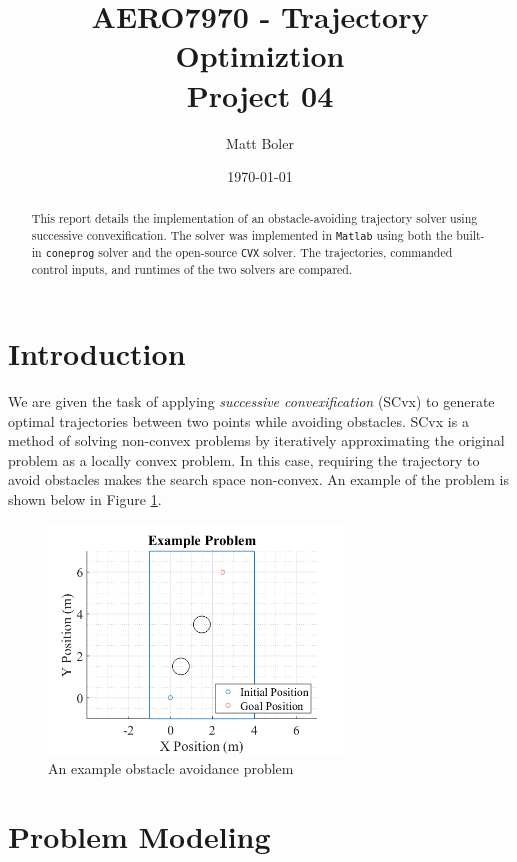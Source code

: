 \documentclass{article}
\title{AERO7970 - Trajectory Optimiztion \\ {\small Project 04}}
\author{Matt Boler}
\date{\today}
\begin{document}
\maketitle

\begin{abstract}
  This report details the implementation of an obstacle-avoiding trajectory solver using successive convexification.
  The solver was implemented in \texttt{Matlab} using both the built-in \texttt{coneprog} solver and the open-source \texttt{CVX} solver.
  The trajectories, commanded control inputs, and runtimes of the two solvers are compared.
\end{abstract}

\section{Introduction}

We are given the task of applying \textit{successive convexification} (SCvx)\cite{mao_successive_2019} to generate optimal trajectories between two points while avoiding obstacles.
SCvx is a method of solving non-convex problems by iteratively approximating the original problem as a locally convex problem.
In this case, requiring the trajectory to avoid obstacles makes the search space non-convex.
An example of the problem is shown below in Figure \ref{fig:example}.

\begin{figure}[H]
  \centering
  \includegraphics[width=0.7\textwidth]{images/example.png}
  \caption{An example obstacle avoidance problem}
  \label{fig:example}
\end{figure}

\section{Problem Modeling}
\end{document}
